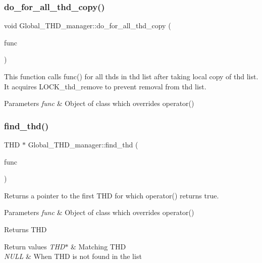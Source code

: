 \subsubsection{\texorpdfstring{do\+\_\+for\+\_\+all\+\_\+thd\+\_\+copy()}{do\_for\_all\_thd\_copy()}}
{\footnotesize\ttfamily void Global\+\_\+\+T\+H\+D\+\_\+manager\+::do\+\_\+for\+\_\+all\+\_\+thd\+\_\+copy (\begin{DoxyParamCaption}\item[{\mbox{\hyperlink{classDo__THD__Impl}{Do\+\_\+\+T\+H\+D\+\_\+\+Impl}} $\ast$}]{func }\end{DoxyParamCaption})}

This function calls func() for all thds in thd list after taking local copy of thd list. It acquires L\+O\+C\+K\+\_\+thd\+\_\+remove to prevent removal from thd list. 
\begin{DoxyParams}{Parameters}
{\em func} & Object of class which overrides operator() \\
\hline
\end{DoxyParams}
\mbox{\label{classGlobal__THD__manager_ae533bd3cb655dbbdb30bfd1703110dba}} 
\subsubsection{\texorpdfstring{find\+\_\+thd()}{find\_thd()}}
{\footnotesize\ttfamily T\+HD $\ast$ Global\+\_\+\+T\+H\+D\+\_\+manager\+::find\+\_\+thd (\begin{DoxyParamCaption}\item[{\mbox{\hyperlink{classFind__THD__Impl}{Find\+\_\+\+T\+H\+D\+\_\+\+Impl}} $\ast$}]{func }\end{DoxyParamCaption})}

Returns a pointer to the first T\+HD for which operator() returns true. 
\begin{DoxyParams}{Parameters}
{\em func} & Object of class which overrides operator() \\
\hline
\end{DoxyParams}
\begin{DoxyReturn}{Returns}
T\+HD 
\end{DoxyReturn}

\begin{DoxyRetVals}{Return values}
{\em T\+H\+D$\ast$} & Matching T\+HD \\
\hline
{\em N\+U\+LL} & When T\+HD is not found in the list \\
\hline
\end{DoxyRetVals}
\mbox{\label{classGlobal__THD__manager_a5e4a050bfded837c0faf11f11f83557e}} 
